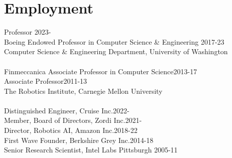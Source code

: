 
\section{Employment}
\noindent
Professor \hfill 2023-\phantom{20}\\
Boeing Endowed Professor in Computer Science \& Engineering \hfill 2017-23\\
Computer Science \& Engineering Department, 
University of Washington\\
\\
Finmeccanica Associate Professor in Computer Science\hfill 2013-17\\
Associate Professor\hfill 2011-13\\
The Robotics Institute,  Carnegie Mellon University\\
\\
Distinguished Engineer, Cruise Inc.\hfill 2022-\phantom{20}\\
Member, Board of Directors, Zordi Inc.\hfill 2021-\phantom{20}\\
Director, Robotics AI, Amazon Inc.\hfill 2018-22\\
First Wave Founder, Berkshire Grey Inc.\hfill 2014-18\\
Senior Research Scientist, Intel Labs Pittsburgh \hfill 2005-11

